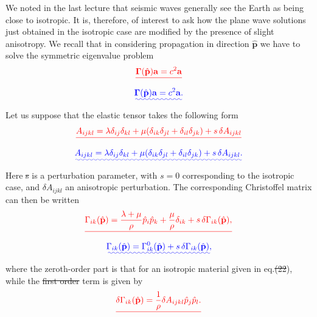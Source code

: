 \documentclass [a4paper,12pt]{paper}
\providecommand{\DIFadd}[1]{{\protect\color{blue}\uwave{#1}}} %
\providecommand{\DIFdel}[1]{{\protect\color{red}\sout{#1}}}                      %
\providecommand{\DIFaddbegin}{} %
\providecommand{\DIFaddend}{} %
\providecommand{\DIFdelbegin}{} %
\providecommand{\DIFdelend}{} %
\begin{document}
We noted in the last lecture that seismic waves generally see the Earth as being close to isotropic. It is, therefore, of interest to 
ask how the plane wave solutions just obtained in the isotropic case are modified by the presence of
 slight anisotropy. We recall that in considering propagation in direction $\hat{\mathbf{p}}$ we have to solve the symmetric eigenvalue problem
\DIFdelbegin \begin{displaymath}
\DIFdel{\bm{\Gamma}(\hat{\mathbf{p}})\mathbf{a}=c^{2}\mathbf{a}
}\end{displaymath}%
\DIFdelend \DIFaddbegin \begin{equation}
\DIFadd{\bm{\Gamma}(\hat{\mathbf{p}})\mathbf{a}=c^{2}\mathbf{a}.
\label{eq:29}
}\end{equation}\DIFaddend 
Let us suppose that the elastic tensor takes the following form
\DIFdelbegin \begin{displaymath}
\DIFdel{A_{ijkl}=\lambda\delta_{ij}\delta_{kl}+\mu(\delta_{ik}\delta_{jl}+\delta_{il}\delta_{jk})+s\,\delta A_{ijkl}
}\end{displaymath}%
\DIFdelend \DIFaddbegin \begin{equation}
\DIFadd{A_{ijkl}=\lambda\delta_{ij}\delta_{kl}+\mu(\delta_{ik}\delta_{jl}+\delta_{il}\delta_{jk})+s\,\delta A_{ijkl}.
\label{eq:30}
}\end{equation}\DIFaddend 
Here \DIFdelbegin \DIFdel{s }\DIFdelend \DIFaddbegin \DIFadd{$s$ }\DIFaddend is a perturbation parameter, with $s=0$ corresponding to the isotropic case, and $\delta A_{ijkl}$ an anisotropic perturbation. 
The corresponding Christoffel matrix can then be written
\DIFdelbegin \begin{displaymath}
\DIFdel{\Gamma_{ik}(\hat{\mathbf{p}})=\frac{\lambda+\mu}{\rho}\hat{p}_{i}\hat{p}_{k}+\frac{\mu}{\rho}\delta_{ik}+s\,\delta\Gamma_{ik}(\hat{\mathbf{p}}),
}\end{displaymath}%
\DIFdelend \DIFaddbegin \begin{equation}
\DIFadd{\Gamma_{ik}(\hat{\mathbf{p}})=\Gamma^{0}_{ik}(\hat{\mathbf{p}})+s\,\delta\Gamma_{ik}(\hat{\mathbf{p}}),
\label{eq:31}
}\end{equation}\DIFaddend 
where the zeroth-order part \DIFaddbegin \DIFadd{$\bm{\Gamma}^{0}(\hat{\mathbf{p}})$ }\DIFaddend is that for an isotropic material given in eq.\DIFdelbegin \DIFdel{(22}\DIFdelend \DIFaddbegin \DIFadd{~(\ref{eq:22}}\DIFaddend ), while the \DIFdelbegin \DIFdel{first order }\DIFdelend \DIFaddbegin \DIFadd{first-order }\DIFaddend term is given by
\DIFdelbegin \begin{displaymath}
\DIFdel{\delta\Gamma_{ik}(\hat{\mathbf{p}})=\frac{1}{\rho}\delta A_{ijkl}\hat{p}_{j}\hat{p}_{l}.
}\end{displaymath}%
\end{document}
